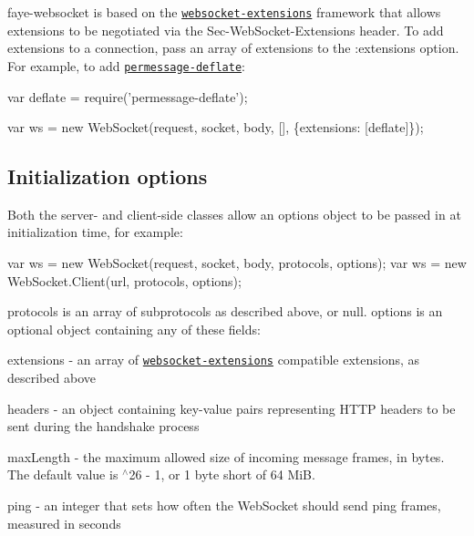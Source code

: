 faye-\/websocket is based on the \href{https://github.com/faye/websocket-extensions-node}{\tt websocket-\/extensions} framework that allows extensions to be negotiated via the {\ttfamily Sec-\/\+Web\+Socket-\/\+Extensions} header. To add extensions to a connection, pass an array of extensions to the {\ttfamily \+:extensions} option. For example, to add \href{https://github.com/faye/permessage-deflate-node}{\tt permessage-\/deflate}\+:


\begin{DoxyCode}
var deflate = require('permessage-deflate');

var ws = new WebSocket(request, socket, body, [], \{extensions: [deflate]\});
\end{DoxyCode}


\subsection*{Initialization options}

Both the server-\/ and client-\/side classes allow an options object to be passed in at initialization time, for example\+:


\begin{DoxyCode}
var ws = new WebSocket(request, socket, body, protocols, options);
var ws = new WebSocket.Client(url, protocols, options);
\end{DoxyCode}


{\ttfamily protocols} is an array of subprotocols as described above, or {\ttfamily null}. {\ttfamily options} is an optional object containing any of these fields\+:


\begin{DoxyItemize}
\item {\ttfamily extensions} -\/ an array of \href{https://github.com/faye/websocket-extensions-node}{\tt websocket-\/extensions} compatible extensions, as described above
\item {\ttfamily headers} -\/ an object containing key-\/value pairs representing H\+T\+TP headers to be sent during the handshake process
\item {\ttfamily max\+Length} -\/ the maximum allowed size of incoming message frames, in bytes. The default value is {$^\wedge$26 -\/ 1}, or 1 byte short of 64 MiB.
\item {\ttfamily ping} -\/ an integer that sets how often the Web\+Socket should send ping frames, measured in seconds
\end{DoxyItemize}

